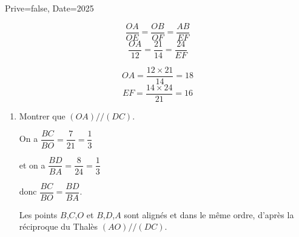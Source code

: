 \documentclass[a4paper,12pt]{article}
\begin{document}
\begin{Maquette}[Exam]{Prive=false, Date=2025}
\begin{exercice}[BaremeDetaille]
\begin{minipage}{.7\linewidth}
\begin{enumerate}
\begin{minipage}{.5\linewidth}
$$\dfrac{OA}{OE}=\dfrac{OB}{OF}=\dfrac{AB}{EF} $$
$$\dfrac{OA}{12}=\dfrac{21}{14}=\dfrac{24}{EF} $$
\end{minipage}%
\begin{minipage}{.5\linewidth}
$$OA=\dfrac{12\times 21}{14}=18$$
$$EF=\dfrac{14\times 24}{21}=16$$
\end{minipage}
\end{enumerate}
\end{minipage}%
\begin{minipage}{.3\linewidth}
\end{minipage}\vspace{5mm}

\begin{enumerate}[start=2]
\item{} Montrer que $(OA)//(DC)$.

On a $\dfrac{BC}{BO}=\dfrac{7}{21}=\dfrac{1}{3}$

et on a $\dfrac{BD}{BA}=\dfrac{8}{24}=\dfrac{1}{3}$

donc $\dfrac{BC}{BO}=\dfrac{BD}{BA}$.

Les points $B$,$C$,$O$ et $B$,$D$,$A$ sont alignés et dans le même ordre, d'après la réciproque du Thalès $(AO)//(DC)$.
\end{enumerate}
\end{exercice}

\end{Maquette}
\end{document}
